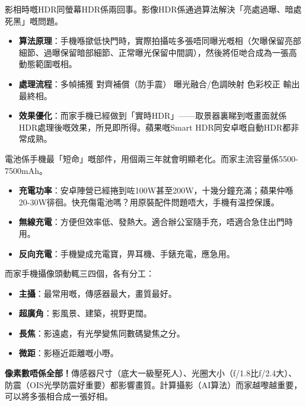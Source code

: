 
影相時嘅HDR同螢幕HDR係兩回事。影像HDR係通過算法解決「亮處過曝、暗處死黑」嘅問題。

\begin{itemize}
  \item \textbf{算法原理}：手機喺撳低快門時，實際拍攝咗多張唔同曝光嘅相（欠曝保留亮部細節、過曝保留暗部細節、正常曝光保留中間調），然後將佢哋合成為一張高動態範圍嘅相。
  \item \textbf{處理流程}：多幀捕獲 對齊補償（防手震） 曝光融合/色調映射 色彩校正 輸出最終相。
  \item \textbf{效果優化}：而家手機已經做到「實時HDR」——取景器裏睇到嘅畫面就係HDR處理後嘅效果，所見即所得。蘋果嘅Smart HDR同安卓嘅自動HDR都非常成熟。
\end{itemize}


電池係手機最「短命」嘅部件，用個兩三年就會明顯老化。而家主流容量係5500-7500mAh。

\begin{itemize}
  \item \textbf{充電功率}：安卓陣營已經捲到咗100W甚至200W，十幾分鐘充滿；蘋果仲喺20-30W徘徊。快充傷電池嗎？用原裝配件問題唔大，手機有温控保護。
  \item \textbf{無線充電}：方便但效率低、發熱大。適合辦公室隨手充，唔適合急住出門時用。
  \item \textbf{反向充電}：手機變成充電寶，畀耳機、手錶充電，應急用。
\end{itemize}


而家手機攝像頭動輒三四個，各有分工：

\begin{itemize}
  \item \textbf{主攝}：最常用嘅，傳感器最大，畫質最好。
  \item \textbf{超廣角}：影風景、建築，視野更闊。
  \item \textbf{長焦}：影遠處，有光學變焦同數碼變焦之分。
  \item \textbf{微距}：影極近距離嘅小嘢。
\end{itemize}

\textbf{像素數唔係全部！}傳感器尺寸（底大一級壓死人）、光圈大小（f/1.8比f/2.4大）、防震（OIS光學防震好重要）都影響畫質。計算攝影（AI算法）而家越嚟越重要，可以將多張相合成一張好相。


